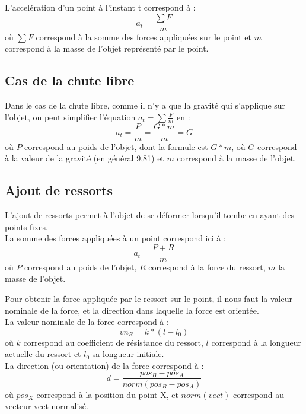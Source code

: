 \documentclass[a4paper]{article}
\begin{document}
L'accelération d'un point à l'instant t correspond à :
\begin{equation}
  a_t = \frac{\sum F}{m}
\end{equation}
où $\sum F$ correspond à la somme des forces appliquées sur le point et $m$ correspond à la masse de l'objet représenté par le point.

\subsection{Cas de la chute libre}

Dans le cas de la chute libre, comme il n'y a que la gravité qui s'applique sur l'objet, on peut simplifier l'équation $a_t = \sum \frac{F}{m}$ en :
\begin{equation}
  a_t = \frac{P}{m} = \frac{G * m}{m} = G
\end{equation}
où $P$ correspond au poids de l'objet, dont la formule est $G * m$, où $G$ correspond à la valeur de la gravité (en général 9,81) et $m$ correspond à la masse de l'objet.

\subsection{Ajout de ressorts}

L'ajout de ressorts permet à l'objet de se déformer lorsqu'il tombe en ayant des points fixes.\\

La somme des forces appliquées à un point correspond ici à :
\begin{equation}
  a_t = \frac{P + R}{m}
\end{equation}
où $P$ correspond au poids de l'objet, $R$ correspond à la force du ressort, $m$ la masse de l'objet.

Pour obtenir la force appliquée par le ressort sur le point, il nous faut la valeur nominale de la force, et la direction dans laquelle la force est orientée.\\

La valeur nominale de la force correspond à :
\begin{equation}
  vn_R = k * (l - l_0)
\end{equation}
où $k$ correspond au coefficient de résistance du ressort, $l$ correspond à la longueur actuelle du ressort et $l_0$ sa longueur initiale.\\

La direction (ou orientation) de la force correspond à :
\begin{equation}
  d = \frac{pos_B - pos_A}{norm(pos_B - pos_A)}
\end{equation}
où $pos_X$ correspond à la position du point X, et $norm(vect)$ correspond au vecteur vect normalisé.
\end{document}
